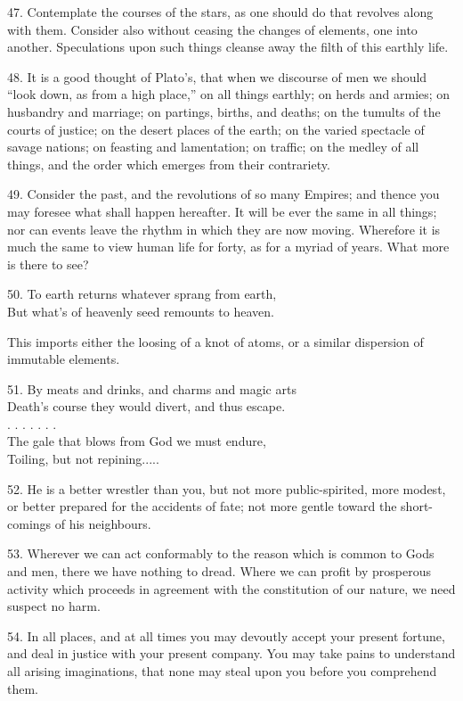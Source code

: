 \documentclass{book}
\begin{document}
47. Contemplate the courses of the stars, as one should do that
revolves along with them. Consider also without ceasing the changes of
elements, one into another. Speculations upon such things cleanse away
the filth of this earthly life.

48. It is a good thought of Plato's, that when we discourse of men we
should ``look down, as from a high place,'' on all things earthly; on
herds and armies; on husbandry and marriage; on partings, births, and
deaths; on the tumults of the courts of justice; on the desert places
of the earth; on the varied spectacle of savage nations; on feasting
and lamentation; on traffic; on the medley of all things, and the
order which emerges from their contrariety.

49. Consider the past, and the revolutions of so many Empires; and
thence you may foresee what shall happen hereafter. It will be ever
the same in all things; nor can events leave the rhythm in which they
are now moving. Wherefore it is much the same to view human life for
forty, as for a myriad of years. What more is there to see?

50. To earth returns whatever sprang from earth, \\
    But what's of heavenly seed remounts to heaven.

This imports either the loosing of a knot of atoms, or a similar
dispersion of immutable elements.

51. By meats and drinks, and charms and magic arts \\
    Death's course they would divert, and thus escape. \\
    .  .  .  .  .  .  . \\
    The gale that blows from God we must endure, \\
    Toiling, but not repining.....

52. He is a better wrestler than you, but not more public-spirited,
more modest, or better prepared for the accidents of fate; not more
gentle toward the short-comings of his neighbours.

53. Wherever we can act conformably to the reason which is common to
Gods and men, there we have nothing to dread. Where we can profit by
prosperous activity which proceeds in agreement with the constitution
of our nature, we need suspect no harm.

54. In all places, and at all times you may devoutly accept your
present fortune, and deal in justice with your present company. You
may take pains to understand all arising imaginations, that none may
steal upon you before you comprehend them.
\end{document}
